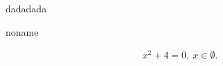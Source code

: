 \nocite{*}
\section{}

\solving

\ansver

\begin{thm}[blablabla]
	dadadada
	\label{thm:thm}
\end{thm}
\begin{thm}
	noname
	\label{thm:noname}
\end{thm}

\begin{gather}
	x^2+4=0,\ x \in \emptyset.\label{eq:shit}	
\end{gather}
\\
\\
